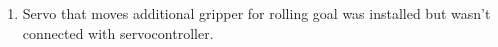 \begin{enumerate}
\begin{enumerate}
        \item Servo that moves additional gripper for rolling goal was installed but wasn't connected with servocontroller.
        \begin{figure}[H]
	  	  \begin{minipage}[h]{0.47\linewidth}
	  	  \end{minipage}
	  	  \hfill
	  	  \begin{minipage}[h]{0.47\linewidth}

\end{minipage}
\end{figure}
\end{enumerate}
\end{enumerate}

